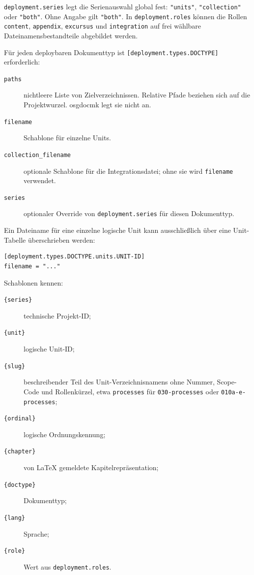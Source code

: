 \documentclass[
load-preamble+
]{osgdoc}
\begin{document}
\verb|deployment.series| legt die Serienauswahl global fest:
\verb|"units"|, \verb|"collection"| oder \verb|"both"|. Ohne Angabe
gilt \verb|"both"|. In \verb|deployment.roles| können die Rollen
\texttt{content}, \texttt{appendix}, \texttt{excursus} und
\texttt{integration} auf frei wählbare Dateinamensbestandteile abgebildet
werden.

Für jeden deploybaren Dokumenttyp ist
\verb|[deployment.types.DOCTYPE]| erforderlich:

\begin{description}
\item[\texttt{paths}] nichtleere Liste von Zielverzeichnissen. Relative Pfade
  beziehen sich auf die Projektwurzel. osgdocmk legt sie nicht an.
\item[\texttt{filename}] Schablone für einzelne Units.
\item[\texttt{collection\_filename}] optionale Schablone für die
  Integrationsdatei; ohne sie wird \texttt{filename} verwendet.
\item[\texttt{series}] optionaler Override von
  \verb|deployment.series| für diesen Dokumenttyp.
\end{description}

Ein Dateiname für eine einzelne logische Unit kann ausschließlich über eine
Unit-Tabelle überschrieben werden:

\begin{verbatim}
[deployment.types.DOCTYPE.units.UNIT-ID]
filename = "..."
\end{verbatim}

Schablonen kennen:

\begin{description}
\item[\texttt{\{series\}}] technische Projekt-ID;
\item[\texttt{\{unit\}}] logische Unit-ID;
\item[\texttt{\{slug\}}] beschreibender Teil des Unit-Verzeichnisnamens
  ohne Nummer, Scope-Code und Rollenkürzel, etwa \texttt{processes} für
  \texttt{030-processes} oder \texttt{010a-e-processes};
\item[\texttt{\{ordinal\}}] logische Ordnungskennung;
\item[\texttt{\{chapter\}}] von LaTeX gemeldete Kapitelrepräsentation;
\item[\texttt{\{doctype\}}] Dokumenttyp;
\item[\texttt{\{lang\}}] Sprache;
\item[\texttt{\{role\}}] Wert aus \verb|deployment.roles|.
\end{description}
\end{document}
